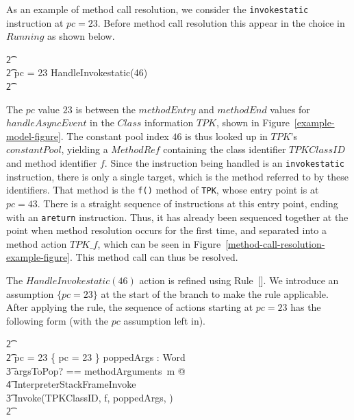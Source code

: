 As an example of method call resolution, we consider the
\texttt{invokestatic} instruction at $pc = 23$. 
Before method call resolution this appear in the choice in $Running$
as shown below.
\begin{circusaction}
  \t2 {} \cdots {} \\
  \t2 {} \circelse pc = 23 \circthen HandleInvokestatic(46) \\
  \t2 {} \cdots {} \\
\end{circusaction}
The $pc$ value $23$ is between the $methodEntry$ and $methodEnd$
values for $handleAsyncEvent$ in the $Class$ information $TPK$, shown
in Figure~\ref{example-model-figure}.
The constant pool index $46$ is thus looked up in $TPK$'s
$constantPool$, yielding a $MethodRef$ containing the class identifier
$TPKClassID$ and method identifier $f$.
Since the instruction being handled is an \texttt{invokestatic}
instruction, there is only a single target, which is the method
referred to by these identifiers.
That method is the \texttt{f()} method of \texttt{TPK}, whose entry
point is at $pc = 43$.
There is a straight sequence of instructions at this entry point,
ending with an \texttt{areturn} instruction. 
Thus, it has already been sequenced together at the point when method
resolution occurs for the first time, and separated into a method
action $TPK\_f$, which can be seen in
Figure~\ref{method-call-resolution-example-figure}.
This method call can thus be resolved.

The $HandleInvokestatic(46)$ action is refined using
Rule~[]. 
We introduce an assumption $\{ pc = 23 \}$ at the start of the branch
to make the rule applicable.
After applying the rule, the sequence of actions starting at $pc = 23$
has the following form (with the $pc$ assumption left in).
\begin{circusaction}
  \t2 {} \cdots {} \\
  \t2 {} \circelse pc = 23 \circthen \{ pc = 23 \} \circseq \circvar poppedArgs : \seq Word \circspot \\
  \t3 \lschexpract \exists argsToPop? == methodArguments~m @ \\
  \t4 InterpreterStackFrameInvoke \rschexpract \circseq \\
  \t3 Invoke(TPKClassID, f, poppedArgs, \true) \\
  \t2 {} \cdots {}
\end{circusaction}

